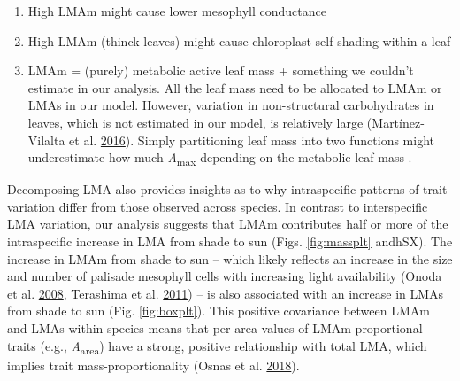 \documentclass[
  12pt,
]{article}
\providecommand{\tightlist}{%
  \setlength{\itemsep}{0pt}\setlength{\parskip}{0pt}}
\begin{document}
\begin{enumerate}
\def\labelenumi{\arabic{enumi}.}
\tightlist
\item
  High LMAm might cause lower mesophyll conductance
\item
  High LMAm (thinck leaves) might cause chloroplast self-shading within a leaf
\item
  LMAm = (purely) metabolic active leaf mass + something we couldn't estimate in our analysis. All the leaf mass need to be allocated to LMAm or LMAs in our model. However, variation in non-structural carbohydrates in leaves, which is not estimated in our model, is relatively large (Martínez-Vilalta et al. \protect\hyperlink{ref-Martinez-Vilalta2016}{2016}). Simply partitioning leaf mass into two functions might underestimate how much \emph{A}\textsubscript{max} depending on the metabolic leaf mass .
\end{enumerate}

Decomposing LMA also provides insights as to why intraspecific patterns of trait variation differ from those observed across species.
In contrast to interspecific LMA variation, our analysis suggests that LMAm contributes half or more of the intraspecific increase in LMA from shade to sun (Figs. \ref{fig:massplt} andhSX).
The increase in LMAm from shade to sun -- which likely reflects an increase in the size and number of palisade mesophyll cells with increasing light availability (Onoda et al. \protect\hyperlink{ref-Onoda2008}{2008}, Terashima et al. \protect\hyperlink{ref-Terashima2011}{2011}) -- is also associated with an increase in LMAs from shade to sun (Fig. \ref{fig:boxplt}).
This positive covariance between LMAm and LMAs within species means that per-area values of LMAm-proportional traits (e.g., \emph{A}\textsubscript{area}) have a strong, positive relationship with total LMA, which implies trait mass-proportionality (Osnas et al. \protect\hyperlink{ref-Osnas2018}{2018}).
\end{document}
